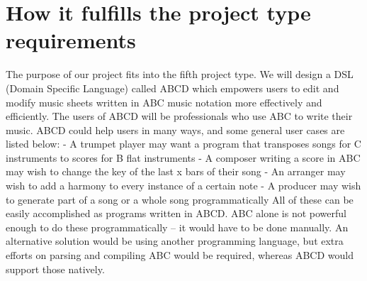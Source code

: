 \section{How it fulfills the project type requirements}

The purpose of our project fits into the fifth project type. We will design a DSL (Domain Specific Language) called ABCD which empowers users to edit and modify music sheets written in ABC music notation more effectively and efficiently. The users of ABCD will be professionals who use ABC to write their music. ABCD could help users in many ways, and some general user cases are listed below:
	- A trumpet player may want a program that transposes songs for C instruments to scores for B flat 	instruments
	- A composer writing a score in ABC may wish to change the key of the last x bars of their song
	- An arranger may wish to add a harmony to every instance of a certain note
	- A producer may wish to generate part of a song or a whole song programmatically
All of these can be easily accomplished as programs written in ABCD. ABC alone is not powerful enough to do these programmatically -- it would have to be done manually. An alternative solution would be using another programming language, but  extra efforts on parsing and compiling ABC would be required, whereas ABCD would support those natively.
